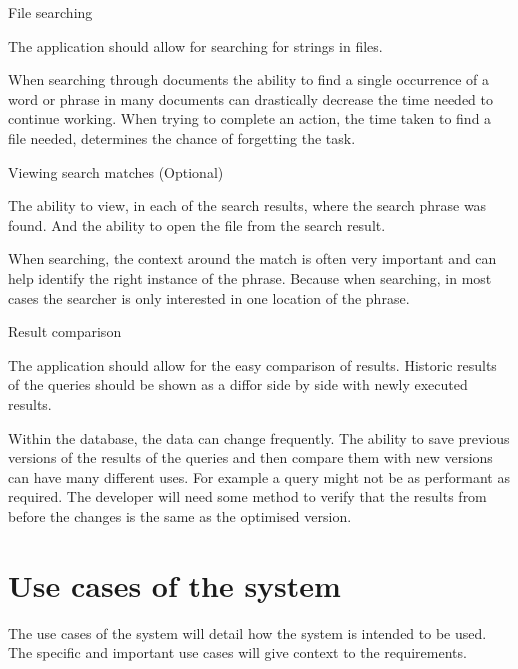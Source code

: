 \begin{requirement}{File searching}
\noindent

The application should allow for searching for strings in files.

When searching through documents the ability to find a single occurrence of a
word or phrase in many documents can drastically decrease the time needed to
continue working. When trying to complete an action, the time taken to find a
file needed, determines the chance of forgetting the task.
\end{requirement}

\begin{requirement}{Viewing search matches (Optional)}
\noindent

The ability to view, in each of the search results, where the search phrase was
found. And the ability to open the file from the search result.

When searching, the context around the match is often very important and can
help identify the right instance of the phrase. Because when searching, in most
cases the searcher is only interested in one location of the phrase.
\end{requirement}

\begin{requirement}{Result comparison}
\noindent

The application should allow for the easy comparison of results. Historic results
of the queries should be shown as a diff\footnotemark or side by side with newly executed
results.


Within the database, the data can change frequently. The ability to save
previous versions of the results of the queries and then compare them with new
versions can have many different uses. For example a query might not be as
performant as required. The developer will need some method to verify that the
results from before the changes is the same as the optimised version.
\end{requirement}

\section{Use cases of the system}\label{use-cases-of-the-system}

The use cases of the system will detail how the system is intended to be used.
The specific and important use cases will give context to the requirements.

